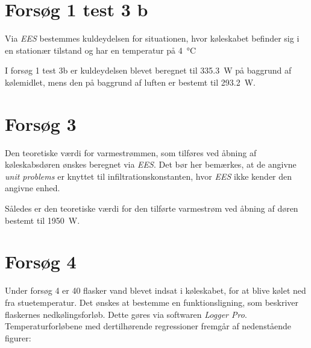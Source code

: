 \documentclass[Hovedrapport.tex]{subfiles}
\begin{document}
\newpage
\section{Forsøg 1 test 3 b}
\label{sec:f1t3b}

Via \textit{EES} bestemmes kuldeydelsen for situationen, hvor køleskabet befinder sig i en stationær tilstand og har en temperatur på \SI{4}{\celsius}

\begin{minipage}{1.0\textwidth}

\end{minipage}



I forsøg 1 test 3b er kuldeydelsen blevet beregnet til \SI{335,3}{W} på baggrund af kølemidlet, mens den på baggrund af luften er bestemt til \SI{293,2}{W}.
\newpage
\section{Forsøg 3 }  
\label{sec:f3}
    
Den teoretiske værdi for varmestrømmen, som tilføres ved åbning af køleskabsdøren ønskes beregnet via \textit{EES}. Det bør her bemærkes, at de angivne \textit{unit problems} er knyttet til infiltrationskonstanten, hvor \textit{EES} ikke kender den angivne enhed. 

\begin{minipage}{1.0\textwidth}

\end{minipage}

\newpage
Således er den teoretiske værdi for den tilførte varmestrøm ved åbning af døren bestemt til \SI{1950}{W}.
\newpage
\newpage
\section{Forsøg 4}
Under forsøg 4 er 40 flasker vand blevet indsat i køleskabet, for at blive kølet ned fra stuetemperatur. Det ønskes at bestemme en funktionsligning, som beskriver flaskernes nedkølingsforløb. Dette gøres via softwaren \textit{Logger Pro}. Temperaturforløbene med dertilhørende regressioner fremgår af nedenstående figurer:
\end{document}
